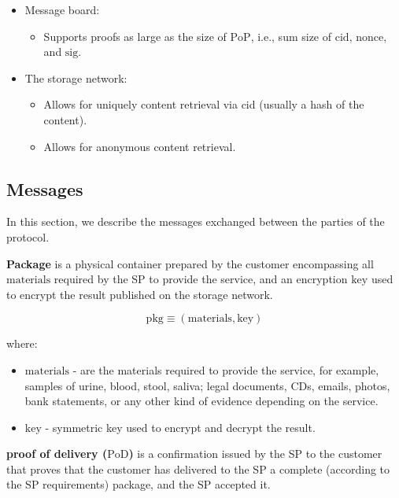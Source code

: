 \documentclass{ieeeaccess}
\begin{document}
\begin{itemize}
\item Message board:
    \begin{itemize}
        \item Supports proofs as large as the size of $\mathrm{PoP}$, i.e., sum size of $\mathrm{cid}$, $\mathrm{nonce}$, and $\mathrm{sig}$.
    \end{itemize}

\item The storage network:
    \begin{itemize}
        \item Allows for uniquely content retrieval via $\mathrm{cid}$ (usually a hash of the content).
        \item Allows for anonymous content retrieval.
    \end{itemize}
\end{itemize}

\subsection{Messages}\label{messages}
In this section, we describe the messages exchanged between the parties of the protocol.

\noindent \textbf
{Package}\label{package} is a physical container prepared by the customer encompassing all $\mathrm{materials}$ required by the SP to provide the service, and an encryption $\mathrm{key}$ used to encrypt the result published on the storage network.

$$\mathrm{pkg} \equiv (\mathrm{materials}, \mathrm{key})$$

where:

\begin{itemize}

\item $\mathrm{materials}$ - are the materials required to provide the service, for example, samples of urine, blood, stool, saliva; legal documents, CDs, emails, photos, bank statements, or any other kind of evidence depending on the service.
\item $\mathrm{key}$ - symmetric key used to encrypt and decrypt the result.
\end{itemize}

\noindent \textbf
{proof of delivery ($\mathrm{PoD}$)}\label{proof-of-delivery} is a  confirmation issued by the SP to the customer that proves that the customer has delivered to the SP a complete (according to the SP requirements) package, and the SP accepted it.
\end{document}
